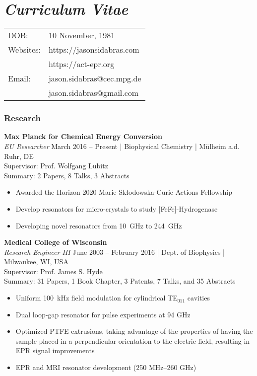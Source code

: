 \chapter[\textit{Curriculum Vitae}.]{\textit{Curriculum Vitae}}
\vspace{-4em}
\vspace{1em}

\begin{tabular}{ll}
DOB:        &   10 November, 1981 \\
Websites:   &   https://jasonsidabras.com \\
            &   https://act-epr.org \\
Email:      &   jason.sidabras@cec.mpg.de \\
            &   jason.sidabras@gmail.com
\end{tabular}

\subsection*{Research}
\vspace{-0.5em}
\textbf{Max Planck for Chemical Energy Conversion}\\
\textit{EU Researcher}
\small{March 2016 – Present | Biophysical Chemistry | M{\"u}lheim a.d. Ruhr, DE \\
Supervisor: Prof. Wolfgang Lubitz \\
Summary: 2 Papers, 8 Talks, 3 Abstracts}
\vspace{-0.5em}
\begin{itemize}
\setlength\itemsep{-0.5em}
    \item Awarded the Horizon 2020 Marie Sk\l{}odowska-Curie Actions Fellowship
    \item Develop resonators for micro-crystals to study [FeFe]-Hydrogenase
    \item Developing novel resonators from 10~GHz to 244~GHz
\end{itemize}

\noindent\textbf{Medical College of Wisconsin}\\
\textit{Research Engineer III}
\small{June 2003 – February 2016 | Dept. of Biophysics | Milwaukee, WI, USA \\
Supervisor: Prof. James S. Hyde \\
Summary: 31 Papers, 1 Book Chapter, 3 Patents, 7 Talks, and 35 Abstracts}
\vspace{-0.5em}
\begin{itemize}
\setlength\itemsep{-0.5em}
    \item Uniform 100~kHz field modulation for cylindrical TE$_{011}$ cavities
    \item Dual loop-gap resonator for pulse experiments at 94 GHz
    \item Optimized PTFE extrusions, taking advantage of the properties of having the sample placed in a perpendicular orientation to the electric field, resulting in EPR signal improvements
    \item EPR and MRI resonator development (250 MHz–260 GHz)
\end{itemize}

